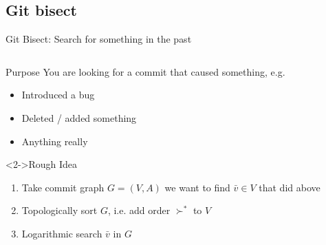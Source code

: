\documentclass[xetex]{beamer}
\begin{document}
\subsection{Git bisect}

\begin{frame}[fragile]{Git Bisect: Search for something in the past}
  \begin{columns}
    \begin{column}{.5\linewidth}
      \begin{block}{Purpose}
        You are looking for a commit that caused something, e.g.
        \begin{itemize}
          \item Introduced a bug
          \item Deleted / added something
          \item Anything really
        \end{itemize}
      \end{block}
      \begin{alertblock}<2->{Rough Idea}
        \begin{enumerate}
          \item Take commit graph $G = (V,A)$ we want to find $\bar{v} \in V$
            that did above
          \item Topologically sort $G$, i.e. add order $\succ^*$ to $V$
          \item Logarithmic search $\bar{v}$ in $G$
        \end{enumerate}
      \end{alertblock}
    \end{column}
    \begin{column}{.5\linewidth}
\end{column}
\end{columns}
\end{frame}
\end{document}
